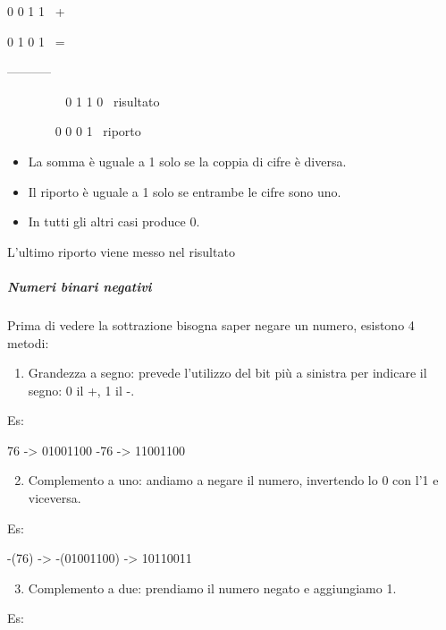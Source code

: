 \documentclass[
]{article}
\providecommand{\tightlist}{%
  \setlength{\itemsep}{0pt}\setlength{\parskip}{0pt}}
\begin{document}
{}

{0 0 1 1 ~+}

{0 1 0 1 ~=}

{-----------}

{~ ~ ~ ~ ~ ~0 1 1 0 ~}{risultato}

{~ ~ ~ ~ ~0 0 0 1 }{~riporto}

{}

\begin{itemize}
\tightlist
\item
  {La somma è uguale a 1 solo se la coppia di cifre è diversa.}
\item
  {Il riporto è uguale a 1 solo se entrambe le cifre sono uno.}
\item
  {In tutti gli altri casi produce 0.}
\end{itemize}

{}

{L'ultimo riporto viene messo nel risultato}

{}

\subparagraph{\texorpdfstring{{Numeri binari
negativi}}{Numeri binari negativi}}\label{h.b940u07xil7d}

{Prima di vedere la sottrazione bisogna saper negare un numero, esistono
4 metodi:}

{}

\begin{enumerate}
\tightlist
\item
  {Grandezza a segno}{: prevede l'utilizzo del bit più a sinistra per
  indicare il segno: 0 il +, 1 il -. }
\end{enumerate}

{Es:}

{76 -> 01001100 -76 -> 11001100}

{}

\begin{enumerate}
\setcounter{enumi}{1}
\tightlist
\item
  {Complemento a uno}{: andiamo a negare il numero, invertendo lo 0 con
  l'1 e viceversa.}
\end{enumerate}

{Es:}

{-(76) -> -(01001100) -> 10110011}

\begin{enumerate}
\setcounter{enumi}{2}
\tightlist
\item
  {Complemento a due}{: prendiamo il numero negato e aggiungiamo 1.}
\end{enumerate}

{Es:}
\end{document}
